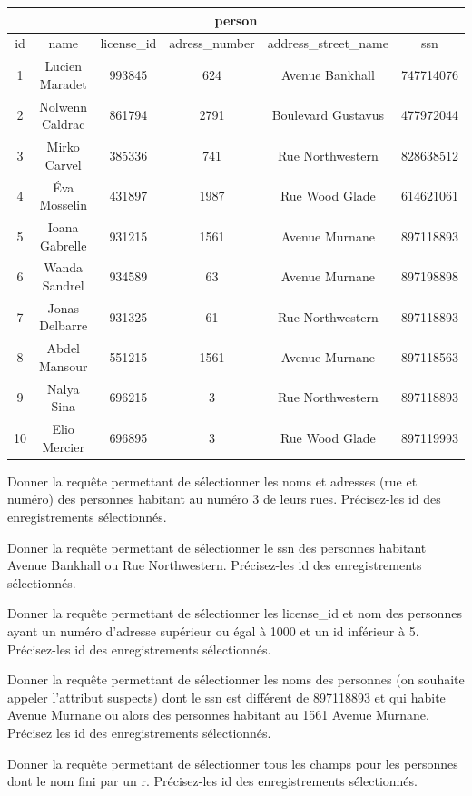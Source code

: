 \begin{Exercise}
    \begin{center}
    \begin{tabular}{|c c c c c c|}
    \hline
    \multicolumn{6}{|c|}{\textbf{person}} \\
    \hline
        id & name & license\_id & adress\_number & address\_street\_name & ssn \\
        \hline
        \hline
        1	& Lucien Maradet	& 993845	& 624	& Avenue Bankhall & 747714076\\
    2	& Nolwenn Caldrac	& 861794	& 2791	& Boulevard Gustavus 	& 477972044\\
    3	& Mirko Carvel	& 385336	& 741	& Rue Northwestern	& 828638512\\
    4	& Éva Mosselin	& 431897	& 1987	& Rue Wood Glade	& 614621061\\
    5	& Ioana Gabrelle & 931215	& 1561	& Avenue Murnane & 897118893\\
    6	& Wanda Sandrel & 934589	& 63	& Avenue Murnane & 897198898\\
    7	& Jonas Delbarre & 931325	& 61	& Rue Northwestern & 897118893\\
    8	& Abdel Mansour & 551215	& 1561	& Avenue Murnane & 897118563\\
    9	& Nalya Sina & 696215	& 3	& Rue Northwestern & 897118893\\
    10	& Elio Mercier & 696895	& 3	& Rue Wood Glade & 897119993\\

    \hline
    \end{tabular}
    \end{center}
    
    \Question Donner la requête permettant de sélectionner les noms et adresses (rue et numéro) des personnes habitant au numéro 3 de leurs rues. Précisez-les id des enregistrements sélectionnés.\\
    \emptybox{2cm}
    
    \Question Donner la requête permettant de sélectionner le ssn des personnes habitant Avenue Bankhall ou Rue Northwestern. Précisez-les id des enregistrements sélectionnés.\\
    \emptybox{2cm}

    \Question Donner la requête permettant de sélectionner les license\_id et nom  des personnes ayant un numéro d'adresse supérieur ou égal à 1000 et un id inférieur à 5. Précisez-les id des enregistrements sélectionnés.\\
    \emptybox{2cm}

     \Question Donner la requête permettant de sélectionner les noms des personnes (on souhaite appeler l'attribut suspects) dont le ssn est différent de 897118893 et qui habite Avenue Murnane ou alors des personnes habitant au 1561 Avenue Murnane. Précisez les id des enregistrements sélectionnés.\\
    \emptybox{2cm}

    \Question Donner la requête permettant de sélectionner tous les champs pour les personnes dont le nom fini par un r. Précisez-les id des enregistrements sélectionnés.\\
    \emptybox{2cm}
\end{Exercise} 

